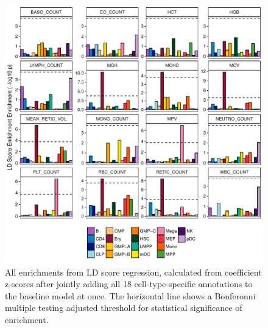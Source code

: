 \documentclass{article}\usepackage[]{graphicx}\usepackage[]{color}
\makeatletter
\def\maxwidth{ %
  \ifdim\Gin@nat@width>\linewidth
    \linewidth
  \else
    \Gin@nat@width
  \fi
}
\newenvironment{knitrout}{}{} %
\makeatother
\begin{document}
\begin{knitrout}
\color{fgcolor}\begin{figure}[H]

{\centering \includegraphics[width=\maxwidth]{figure/panhemeLDscore-1} 

}

\caption[All enrichments from LD score regression, calculated from coefficient z-scores after jointly adding all 18 cell-type-specific annotations to the baseline model at once]{All enrichments from LD score regression, calculated from coefficient z-scores after jointly adding all 18 cell-type-specific annotations to the baseline model at once. The horizontal line shows a Bonferonni multiple testing adjusted threshold for statistical significance of enrichment.}\label{fig:panhemeLDscore}
\end{figure}


\end{knitrout}
\end{document}
